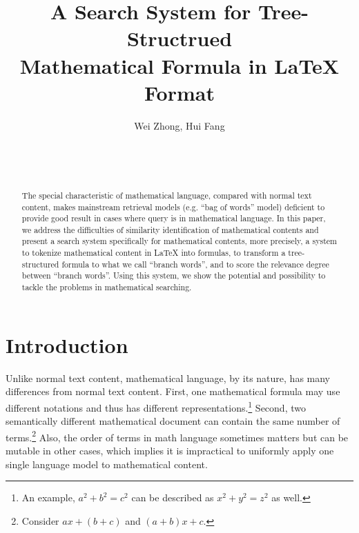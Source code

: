\documentclass{acm_proc_article-sp}
\begin{document}
\title{A Search System for Tree-Structrued \\ Mathematical Formula in {\ttlit LaTeX} Format}

\author{
\alignauthor Wei Zhong,\; Hui Fang\\
       \\
       \\
       \\
}

\maketitle
\begin{abstract}
The special characteristic of mathematical language, compared with normal text content, makes mainstream retrieval models (e.g. ``bag of words'' model) deficient to provide good result in cases where query is in mathematical language. In this paper, we address the difficulties of similarity identification of mathematical contents and present a search system specifically for mathematical contents, more precisely, a system to tokenize mathematical content in \LaTeX{} into formulas, to transform a tree-structured formula to what we call ``branch words'', and to score the relevance degree between ``branch words''. Using this system, we show the potential and possibility to tackle the problems in mathematical searching.
\end{abstract}



\section{Introduction}
Unlike normal text content, mathematical language, by its nature, has many differences from normal text content. First, one mathematical formula may use different notations and thus has different representations.\footnote{An example, $a^2 + b^2 = c^2$ can be described as $x^2 + y^2 = z^2$ as well.} Second, two semantically different mathematical document can contain the same number of terms.\footnote{Consider $ax+(b+c)$ and $(a+b)x+c$.} Also, the order of terms in math language sometimes matters but can be mutable in other cases, which implies it is impractical to uniformly apply one single language model to mathematical content. \\
\end{document}
